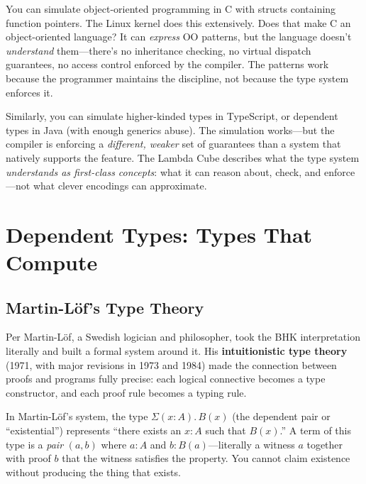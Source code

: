 \documentclass[11pt,a4paper]{article}
\theoremstyle{definition}
\begin{document}
\begin{intuition}
You can simulate object-oriented programming in C with structs containing
function pointers. The Linux kernel does this extensively. Does that make C
an object-oriented language? It can \emph{express} OO patterns, but the
language doesn't \emph{understand} them---there's no inheritance checking, no
virtual dispatch guarantees, no access control enforced by the compiler. The
patterns work because the programmer maintains the discipline, not because
the type system enforces it.

Similarly, you can simulate higher-kinded types in TypeScript, or dependent
types in Java (with enough generics abuse). The simulation works---but the
compiler is enforcing a \emph{different, weaker} set of guarantees than a
system that natively supports the feature. The Lambda Cube describes what the
type system \emph{understands as first-class concepts}: what it can reason
about, check, and enforce---not what clever encodings can approximate.
\end{intuition}


\section{Dependent Types: Types That Compute}\label{sec:dependent-sec}

\subsection{Martin-L\"of's Type Theory}\label{sec:martinlof}

Per Martin-L\"of, a Swedish logician and philosopher, took the BHK
interpretation literally and built a formal system around it. His
\textbf{intuitionistic type theory} (1971, with major revisions in 1973 and
1984) made the connection between proofs and programs fully precise: each
logical connective becomes a type constructor, and each proof rule becomes a
typing rule.

In Martin-L\"of's system, the type $\Sigma(x{:}A).\, B(x)$ (the dependent pair
or ``existential'') represents ``there exists an $x : A$ such that $B(x)$.'' A
term of this type is a \emph{pair} $(a, b)$ where $a : A$ and
$b : B(a)$---literally a witness $a$ together with proof $b$ that the witness
satisfies the property. You cannot claim existence without producing the thing
that exists.
\end{document}
